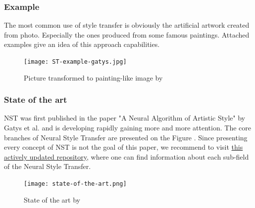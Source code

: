 \documentclass[../Main.tex]{subfiles}
\begin{document}
        
\newpage
    
    \subsubsection{Example}
    The most common use of style transfer is obviously the artificial artwork created from photo. Especially the ones produced from some famous paintings. Attached examples give an idea of this approach capabilities. \\
    \begin{figure}[h!]
        \centering
        \texttt{[image: ST-example-gatys.jpg]}
        \caption{Picture transformed to painting-like image by \cite{gatys2015neural}}
        \label{fig:ST-example-gatys}
    \end{figure}

    \subsubsection{State of the art}
    NST was first published in the paper "A Neural Algorithm of Artistic Style" by Gatys et al.  and is developing rapidly gaining more and more attention. The core branches of Neural Style Transfer are presented on the Figure . Since presenting every concept of NST is not the goal of this paper, we recommend to visit \href{https://github.com/ycjing/Neural-Style-Transfer-Papers}{this actively updated repository}, where one can find information about each sub-field of the Neural Style Transfer. \\
    \begin{figure}[h!]
        \centering
        \texttt{[image: state-of-the-art.png]}
        \caption{State of the art by }
        \label{fig:state-of-the-art}
    \end{figure}
    
\end{document}
